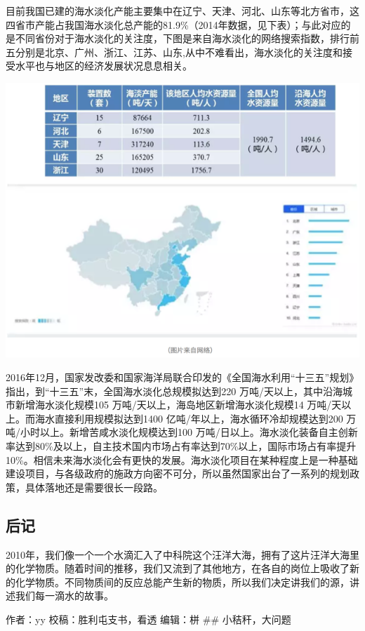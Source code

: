 \documentclass[]{book}
\begin{document}
目前我国已建的海水淡化产能主要集中在辽宁、天津、河北、山东等北方省市，这四省市产能占我国海水淡化总产能的81.9\%（2014年数据，见下表）；与此对应的是不同省份对于海水淡化的关注度，下图是来自海水淡化的网络搜索指数，排行前五分别是北京、广州、浙江、江苏、山东,从中不难看出，海水淡化的关注度和接受水平也与地区的经济发展状况息息相关。

\includegraphics[width=8.33in]{images/seawater5}

2016年12月，国家发改委和国家海洋局联合印发的《全国海水利用``十三五''规划》指出，到``十三五''末，全国海水淡化总规模拟达到220
万吨/天以上，其中沿海城市新增海水淡化规模105
万吨/天以上，海岛地区新增海水淡化规模14
万吨/天以上。而海水直接利用规模拟达到1400
亿吨/年以上，海水循环冷却规模达到200
万吨/小时以上。新增苦咸水淡化规模达到100
万吨/日以上。海水淡化装备自主创新率达到80\%及以上，自主技术国内市场占有率达到70\%以上，国际市场占有率提升10\%。相信未来海水淡化会有更快的发展。海水淡化项目在某种程度上是一种基础建设项目，与各级政府的施政方向密不可分，所以虽然国家出台了一系列的规划政策，具体落地还是需要很长一段路。

\subsection{后记}

2010年，我们像一个一个水滴汇入了中科院这个汪洋大海，拥有了这片汪洋大海里的化学物质。随着时间的推移，我们又流到了其他地方，在各自的岗位上吸收了新的化学物质。不同物质间的反应总能产生新的物质，所以我们决定讲我们的源，讲述我们每一滴水的故事。

作者：yy 校稿：胜利屯支书，看透 编辑：栟 \#\# 小秸秆，大问题
\end{document}
